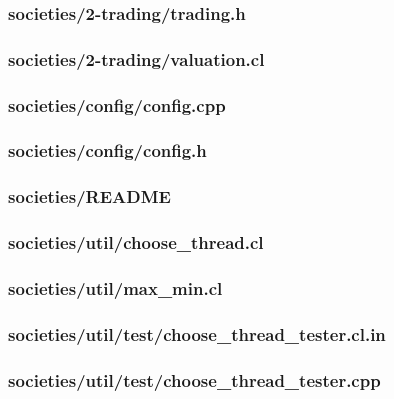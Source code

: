 \documentclass{article}
\begin{document}
\subsubsection*{societies/2-trading/trading.h}


\subsubsection*{societies/2-trading/valuation.cl}


\subsubsection*{societies/config/config.cpp}


\subsubsection*{societies/config/config.h}


\subsubsection*{societies/README}


\subsubsection*{societies/util/choose\_thread.cl}


\subsubsection*{societies/util/max\_min.cl}


\subsubsection*{societies/util/test/choose\_thread\_tester.cl.in}


\subsubsection*{societies/util/test/choose\_thread\_tester.cpp}

\end{document}
